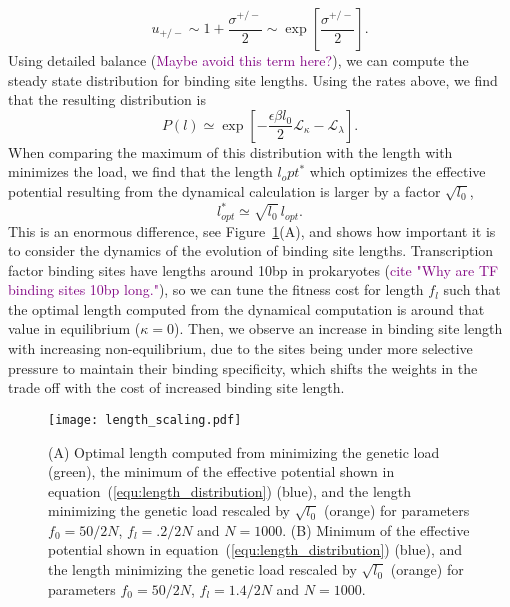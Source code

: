 \documentclass[10pt,a4paper]{article}
\newcommand{\purple}[1]{\textcolor{purple}{#1}}
\begin{document}
\begin{equation}
	u_{+/-} \sim 1 + \frac{\sigma^{+/-}}{2} \sim \exp\left[\frac{\sigma^{+/-}}{2} \right].
\end{equation}
Using detailed balance (\purple{Maybe avoid this term here?}), we can compute the steady state distribution for binding site lengths. Using the rates above, we find that the resulting distribution is
\begin{equation}
	P(l) \simeq \exp\left[-\frac{\epsilon\beta l_0}{2}\mathcal{L}_\kappa - \mathcal{L}_\lambda\right].
	\label{equ:length_distribution}
\end{equation}
When comparing the maximum of this distribution with the length with minimizes the load, we find that the length $l_opt^*$ which optimizes the effective potential resulting from the dynamical calculation is larger by a factor $\sqrt{l_0}$,
\begin{equation}
	l_{opt}^* \simeq \sqrt{l_0}\,l_{opt}.
\end{equation}
This is an enormous difference, see Figure~\ref{fig:length_scalings_main}(A), and shows how important it is to consider the dynamics of the evolution of binding site lengths. Transcription factor binding sites have lengths around 10bp in prokaryotes (\purple{cite "Why are TF binding sites 10bp long."}), so we can tune the fitness cost for length $f_l$ such that the optimal length computed from the dynamical computation is around that value in equilibrium ($\kappa=0$). Then, we observe an increase in binding site length with increasing non-equilibrium, due to the sites being under more selective pressure to maintain their binding specificity, which shifts the weights in the trade off with the cost of increased binding site length.
\begin{figure}
	\centering
	\texttt{[image: length\_scaling.pdf]}
	\caption{(A) Optimal length computed from minimizing the genetic load (green), the minimum of the effective potential shown in equation~(\ref{equ:length_distribution}) (blue), and the length minimizing the genetic load rescaled by $\sqrt{l_0}$ (orange) for parameters $f_0 = 50/2N$, $f_l=.2/2N$ and $N=1000$. (B) Minimum of the effective potential shown in equation~(\ref{equ:length_distribution}) (blue), and the length minimizing the genetic load rescaled by $\sqrt{l_0}$ (orange) for parameters $f_0 = 50/2N$, $f_l=1.4/2N$ and $N=1000$.}
	\label{fig:length_scalings_main}
\end{figure}
\end{document}
